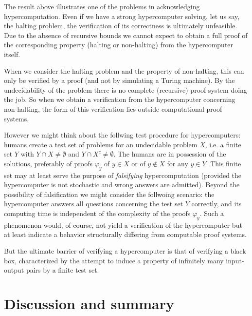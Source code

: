 \documentclass[12pt]{article}
\begin{document}
The result above illustrates one of the problems in acknowledging hypercomputation. Even if we have a strong hypercomputer solving, let us say, the halting problem, the verification of its correctness is ultimately unfeasible. Due to the absence of recursive bounds we cannot expect to obtain a full proof of the corresponding property (halting or non-halting) from the hypercomputer itself.

When we consider the halting problem and the property of non-halting, this can only be verified by a proof (and not by simulating a Turing machine). By the undecidability of the problem there is no complete (recursive) proof system doing the job. So when we obtain a verification from the hypercomputer concerning non-halting, the form of this verification lies outside computational proof systems.

However we might think about the follwing test procedure for hypercomputers: humans create a test set of problems for an undecidable problem $X$, i.e. a finite set $Y$ with $Y \cap X \neq \emptyset$ and $Y \cap X^c \neq \emptyset$. The humans are in possession of the solutions, preferably of proofs $\varphi_y$ of $y \in X$ or of $y \not \in X$ for any $y \in Y$. This finite set may at least serve the purpose of {\em falsifying} hypercomputation (provided the hypercomputer is not stochastic and wrong answers are admitted). Beyond the possibility of falsification we might consider the follwoing scenario: the hypercomputer answers all questions concerning the test set $Y$ correctly, and its computing time is independent of the complexity of the proofs $\varphi_y$. Such a phenomenon-would, of course, not yield a verification of the hypercomputer but at least indicate a behavior structurally differing from computable proof systems.

But the ultimate barrier of verifying a hypercomputer is that of verifying a black box, characterized by the attempt to induce a property of infinitely many input-output pairs by a finite test set.

\section{Discussion and summary}
\end{document}
